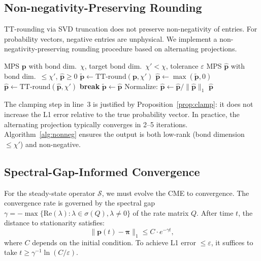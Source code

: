 \documentclass[11pt]{article}
\newcommand{\norm}[1]{\lVert #1 \rVert}
\newcommand{\eps}{\varepsilon}
\begin{document}
\subsection{Non-negativity-Preserving Rounding}\label{sec:algorithms:nonneg}

TT-rounding via SVD truncation does not preserve non-negativity of entries.
For probability vectors, negative entries are unphysical.
We implement a non-negativity-preserving rounding procedure based on
alternating projections.

\begin{algorithm}[t]
\caption{Non-negativity-preserving TT rounding}
\label{alg:nonneg}
\begin{algorithmic}[1]
\REQUIRE MPS $\mathbf{p}$ with bond dim.\ $\chi$, target bond dim.\ $\chi'<\chi$,
         tolerance $\eps$
\ENSURE MPS $\hat{\mathbf{p}}$ with bond dim.\ $\leq \chi'$,
        $\hat{\mathbf{p}} \geq 0$
\STATE $\tilde{\mathbf{p}} \leftarrow \text{TT-round}(\mathbf{p}, \chi')$
  \hfill{}
  \STATE $\hat{\mathbf{p}} \leftarrow \max(\tilde{\mathbf{p}}, 0)$
    \hfill{}
  \STATE $\hat{\mathbf{p}} \leftarrow \text{TT-round}(\hat{\mathbf{p}}, \chi')$
    \hfill{}
  \IF{$\norm{\hat{\mathbf{p}} - \tilde{\mathbf{p}}}_2 < \eps$}
    \STATE \textbf{break}
  \ENDIF
  \STATE $\tilde{\mathbf{p}} \leftarrow \hat{\mathbf{p}}$
\ENDFOR
\STATE Normalize: $\hat{\mathbf{p}} \leftarrow \hat{\mathbf{p}} / \norm{\hat{\mathbf{p}}}_1$
\RETURN $\hat{\mathbf{p}}$
\end{algorithmic}
\end{algorithm}

The clamping step in line~3 is justified by Proposition~\ref{prop:clamp}:
it does not increase the L1 error relative to the true probability
vector.
In practice, the alternating projection typically converges in
2--5 iterations.
Algorithm~\ref{alg:nonneg} ensures the output is both low-rank
(bond dimension $\leq \chi'$) and non-negative.

\subsection{Spectral-Gap-Informed Convergence}\label{sec:algorithms:spectral}

For the steady-state operator $\mathcal{S}$, we must evolve the
CME to convergence.
The convergence rate is governed by the spectral gap
$\gamma = -\max\{\mathrm{Re}(\lambda) : \lambda \in \sigma(Q), \lambda \neq 0\}$
of the rate matrix $Q$.
After time $t$, the distance to stationarity satisfies:
\begin{equation}\label{eq:spectral-convergence}
  \norm{\mathbf{p}(t) - \boldsymbol{\pi}}_1
  \leq C \cdot e^{-\gamma t},
\end{equation}
where $C$ depends on the initial condition.
To achieve L1 error $\leq \eps$, it suffices to take
$t \geq \gamma^{-1}\ln(C/\eps)$.
\end{document}
